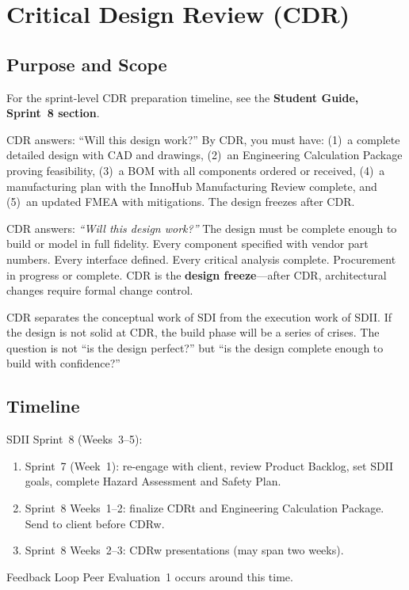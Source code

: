 \chapter{Critical Design Review (CDR)}

\section{Purpose and Scope}

\begin{tipbox}
For the sprint-level CDR preparation timeline, see the \textbf{Student Guide, Sprint~8 section}.
\end{tipbox}


\begin{keyconceptbox}
CDR answers: ``Will this design work?'' By CDR, you must have: (1)~a complete detailed design with CAD and drawings, (2)~an Engineering Calculation Package proving feasibility, (3)~a BOM with all components ordered or received, (4)~a manufacturing plan with the InnoHub Manufacturing Review complete, and (5)~an updated FMEA with mitigations. The design freezes after CDR.
\end{keyconceptbox}

CDR answers: \emph{``Will this design work?''} The design must be complete enough to build or model in full fidelity. Every component specified with vendor part numbers. Every interface defined. Every critical analysis complete. Procurement in progress or complete. CDR is the \textbf{design freeze}---after CDR, architectural changes require formal change control.

CDR separates the conceptual work of SDI from the execution work of SDII. If the design is not solid at CDR, the build phase will be a series of crises. The question is not ``is the design perfect?'' but ``is the design complete enough to build with confidence?''

\section{Timeline}
SDII Sprint~8 (Weeks~3--5):
\begin{enumerate}[nosep,leftmargin=1.5em]
\item Sprint~7 (Week~1): re-engage with client, review Product Backlog, set SDII goals, complete Hazard Assessment and Safety Plan.
\item Sprint~8 Weeks~1--2: finalize CDRt and Engineering Calculation Package. Send to client before CDRw.
\item Sprint~8 Weeks~2--3: CDRw presentations (may span two weeks).
\end{enumerate}
Feedback Loop Peer Evaluation~1 occurs around this time.

